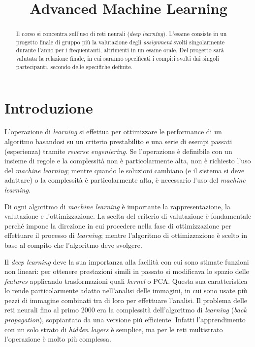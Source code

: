 \documentclass[11pt, a4page]{article}
\title{\textbf{Advanced Machine Learning}}
\author{}
\date{}
\begin{document}
\maketitle
\begin{abstract}
  Il corso si concentra sull'uso di reti neurali (\textit{deep learning}).
  L'esame consiste in un progetto finale di gruppo più la valutazione degli \textit{assignment} svolti singolarmente durante l'anno per i frequentanti, altrimenti in un esame orale.
  Del progetto sarà valutata la relazione finale, in cui saranno specificati i compiti svolti dai singoli partecipanti, secondo delle specifiche definite.
\end{abstract}
\tableofcontents
\newpage

\part{Introduzione}
L'operazione di \textit{learning} si effettua per ottimizzare le performance di un algoritmo basandosi su un criterio prestabilito e una serie di esempi passati (esperienza) tramite \textit{reverse engeniering}.
Se l'operazione è definibile con un insieme di regole e la complessità non è particolarmente alta, non è richiesto l'uso del \textit{machine learning}; mentre quando le soluzioni cambiano (e il sistema si deve adattare) o la complessità è particolarmente alta, è necessario l'uso del \textit{machine learning}.

Di ogni algoritmo di \textit{machine learning} è importante la rappresentazione, la valutazione e l'ottimizzazione.
La scelta del criterio di valutazione è fondamentale perché impone la direzione in cui procedere nella fase di ottimizzazione per effettuare il processo di \textit{learning}; mentre l'algoritmo di ottimizzazione è scelto in base al compito che l'algoritmo deve svolgere. \newline

Il \textit{deep learning} deve la sua importanza alla facilità con cui sono stimate funzioni non lineari: per ottenere prestazioni simili in passato si modificava lo spazio delle \textit{features} applicando trasformazioni quali \textit{kernel} o PCA.
Questa sua caratteristica lo rende particolarmente adatto nell'analisi delle immagini, in cui sono usate più pezzi di immagine combinati tra di loro per effettuare l'analisi.
Il problema delle reti neurali fino al primo 2000 era la complessità dell'algoritmo di \textit{learning} (\textit{back propagation}), soppiantato da una versione più efficiente.
Infatti l'apprendimento con un solo strato di \textit{hidden layers} è semplice, ma per le reti multistrato l'operazione è molto più complessa.
\end{document}
